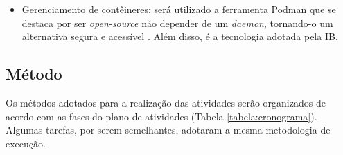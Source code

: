 \documentclass[
	12pt,				%
	a4paper,			%
	english,			%
	brazil,				%
	]{article}
\begin{document}
\begin{itemize}
		
	\item Gerenciamento de contêineres: será utilizado a ferramenta Podman que se destaca por ser \textit{open-source} não depender de um \textit{daemon}, tornando-o um alternativa segura e acessível \cite{redhat2024}. Além disso, é a tecnologia adotada pela IB.
\end{itemize}


\subsection{Método}

Os métodos adotados para a realização das atividades serão organizados de acordo com as fases do plano de atividades (Tabela \ref{tabela:cronograma}). Algumas tarefas, por serem semelhantes, adotaram a mesma metodologia de execução.
\end{document}
